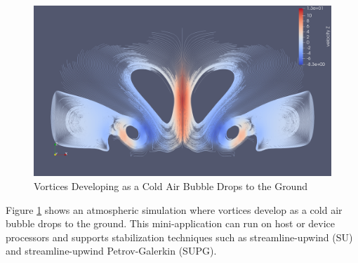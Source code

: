 \begin{figure}[ht!]
\includegraphics[width=.99\linewidth]{../img/Vortices}
\caption{Vortices Developing as a Cold Air Bubble Drops to the Ground}
\label{fig:vortices}
\end{figure}

Figure \ref{fig:vortices} shows an atmospheric simulation where vortices develop as a cold air bubble drops to the ground.
This mini-application can run on host or device processors and supports stabilization techniques such as streamline-upwind (SU) and streamline-upwind Petrov-Galerkin (SUPG).
